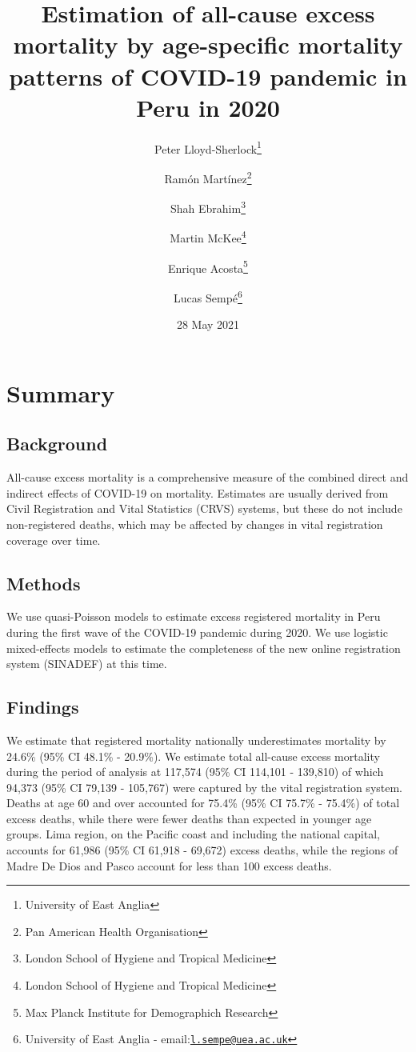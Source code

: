 \documentclass[
]{article}
\title{Estimation of all-cause excess mortality by age-specific mortality patterns of COVID-19 pandemic in Peru in 2020}
\author{Peter Lloyd-Sherlock\footnote{University of East Anglia} \and Ramón Martínez\footnote{Pan American Health Organisation} \and Shah Ebrahim\footnote{London School of Hygiene and Tropical Medicine} \and Martin McKee\footnote{London School of Hygiene and Tropical Medicine} \and Enrique Acosta\footnote{Max Planck Institute for Demographich Research} \and Lucas Sempé\footnote{University of East Anglia - email:\href{mailto:l.sempe@uea.ac.uk}{\nolinkurl{l.sempe@uea.ac.uk}}}}
\date{28 May 2021}
\begin{document}
\maketitle

\hypertarget{summary}{%
\section*{Summary}\label{summary}}

\hypertarget{background}{%
\subsection*{Background}\label{background}}

All-cause excess mortality is a comprehensive measure of the combined direct and indirect effects of COVID-19 on mortality. Estimates are usually derived from Civil Registration and Vital Statistics (CRVS) systems, but these do not include non-registered deaths, which may be affected by changes in vital registration coverage over time.

\hypertarget{methods}{%
\subsection*{Methods}\label{methods}}

We use quasi-Poisson models to estimate excess registered mortality in Peru during the first wave of the COVID-19 pandemic during 2020. We use logistic mixed-effects models to estimate the completeness of the new online registration system (SINADEF) at this time.

\hypertarget{findings}{%
\subsection*{Findings}\label{findings}}

We estimate that registered mortality nationally underestimates mortality by 24.6\% (95\% CI 48.1\% - 20.9\%). We estimate total all-cause excess mortality during the period of analysis at 117,574 (95\% CI 114,101 - 139,810) of which 94,373 (95\% CI 79,139 - 105,767) were captured by the vital registration system. Deaths at age 60 and over accounted for 75.4\% (95\% CI 75.7\% - 75.4\%) of total excess deaths, while there were fewer deaths than expected in younger age groups. Lima region, on the Pacific coast and including the national capital, accounts for 61,986 (95\% CI 61,918 - 69,672) excess deaths, while the regions of Madre De Dios and Pasco account for less than 100 excess deaths.
\end{document}
